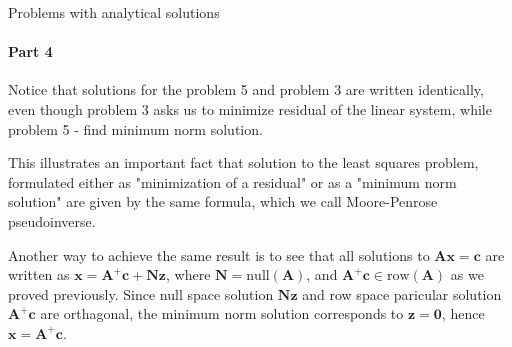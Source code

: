 \documentclass{beamer}
\begin{document}
\begin{frame}{Problems with analytical solutions}
\framesubtitle{Part 4}
\begin{flushleft}

Notice that solutions for the problem 5 and problem 3 are written identically, even though problem 3 asks us to minimize residual of the linear system, while problem 5 - find minimum norm solution. 

\bigskip

This illustrates an important fact that solution to the least squares problem, formulated either as "minimization of a residual" or as a "minimum norm solution" are given by the same formula, which we call Moore-Penrose pseudoinverse.

\bigskip

Another way to achieve the same result is to see that all solutions to $\mathbf{A} \mathbf{x} = \mathbf{c}$ are written as $\mathbf{x} = \mathbf{A}^+\mathbf{c} + \mathbf{N}\mathbf{z}$, where $\mathbf{N} = \text{null}(\mathbf{A})$, and $\mathbf{A}^+\mathbf{c} \in \text{row}(\mathbf{A})$ as we proved previously. Since null space solution $\mathbf{N}\mathbf{z}$ and row space paricular solution $\mathbf{A}^+\mathbf{c}$ are orthagonal, the minimum norm solution corresponds to $\mathbf{z} = \mathbf{0}$, hence $\mathbf{x} = \mathbf{A}^+\mathbf{c}$.

\end{flushleft}
\end{frame}
\end{document}
